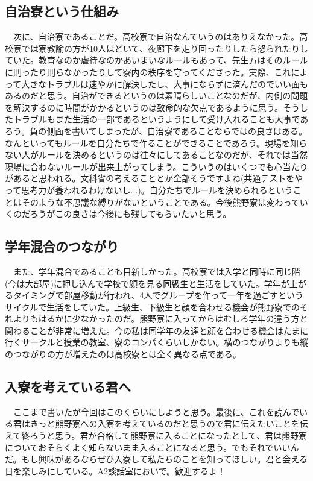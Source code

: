 \subsection{自治寮という仕組み}
　次に、自治寮であることだ。高校寮で自治なんていうのはありえなかった。高校寮では寮教諭の方が10人ほどいて、夜廊下を走り回ったりしたら怒られたりしていた。教育なのか虐待なのかあいまいなルールもあって、先生方はそのルールに則ったり則らなかったりして寮内の秩序を守ってくださった。実際、これによって大きなトラブルは速やかに解決したし、大事にならずに済んだのでいい面もあるのだと思う。自治ができるというのは素晴らしいことなのだが、内側の問題を解決するのに時間がかかるというのは致命的な欠点であるように思う。そうしたトラブルもまた生活の一部であるというようにして受け入れることも大事であろう。負の側面を書いてしまったが、自治寮であることならではの良さはある。なんといってもルールを自分たちで作ることができることであろう。現場を知らない人がルールを決めるというのは往々にしてあることなのだが、それでは当然現場に合わないルールが出来上がってしまう。こういうのはいくつでも心当たりがあると思われる。文科省の考えることとか全部そうですよね(共通テストをやって思考力が養われるわけないし...)。自分たちでルールを決められるということはそのような不思議な縛りがないということである。今後熊野寮は変わっていくのだろうがこの良さは今後にも残してもらいたいと思う。

\subsection{学年混合のつながり}
　また、学年混合であることも目新しかった。高校寮では入学と同時に同じ階(今は大部屋)に押し込んで学校で顔を見る同級生と生活をしていた。学年が上がるタイミングで部屋移動が行われ、4人でグループを作って一年を過ごすというサイクルで生活をしていた。上級生、下級生と顔を合わせる機会が熊野寮でのそれよりもはるかに少なかったのだ。熊野寮に入ってからはむしろ学年の違う方と関わることが非常に増えた。今の私は同学年の友達と顔を合わせる機会はたまに行くサークルと授業の教室、寮のコンパくらいしかない。横のつながりよりも縦のつながりの方が増えたのは高校寮とは全く異なる点である。

\subsection{入寮を考えている君へ}
　ここまで書いたが今回はこのくらいにしようと思う。最後に、これを読んでいる君はきっと熊野寮への入寮を考えているのだと思うので君に伝えたいことを伝えて終ろうと思う。君が合格して熊野寮に入ることになったとして、君は熊野寮についておそらくよく知らないまま入ることになると思う。でもそれでいいんだ。もし興味があるならぜひ入寮して私たちのことを知ってほしい。君と会える日を楽しみにしている。A2談話室においで。歓迎するよ！